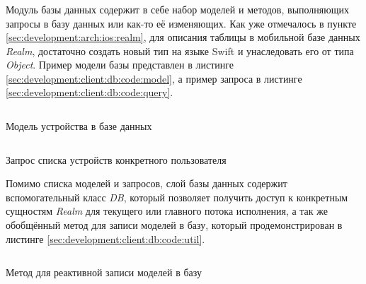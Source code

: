 \subsubsection{}
\label{sec:development:client:db}

Модуль базы данных содержит в себе набор моделей и методов, выполняющих запросы в базу данных или как-то её изменяющих. 
Как уже отмечалось в пункте \ref{sec:development:arch:ios:realm}, для описания таблицы в мобильной базе данных \textit{Realm}, достаточно создать новый тип на языке Swift и унаследовать его от типа \textit{Object}. Пример модели базы представлен в листинге \ref{sec:development:client:db:code:model}, а пример запроса в листинге \ref{sec:development:client:db:code:query}.

\begin{code}
	\inputminted{swift}{inc/src/db_model.swift}
   \caption{Модель устройства в базе данных}
   \label{sec:development:client:db:code:model}
\end{code}

\begin{code}
	\inputminted{swift}{inc/src/db_query.swift}
   \caption{Запрос списка устройств конкретного пользователя}
   \label{sec:development:client:db:code:query}
\end{code}

Помимо списка моделей и запросов, слой базы данных содержит вспомогательный класс \textit{DB}, который позволяет получить доступ к конкретным сущностям \textit{Realm} для текущего или главного потока исполнения, а так же обобщённый метод для записи моделей в базу, который продемонстрирован в листинге \ref{sec:development:client:db:code:util}.

\begin{code}
	\inputminted{swift}{inc/src/db_util.swift}
   \caption{Метод для реактивной записи моделей в базу}
   \label{sec:development:client:db:code:util}
\end{code}